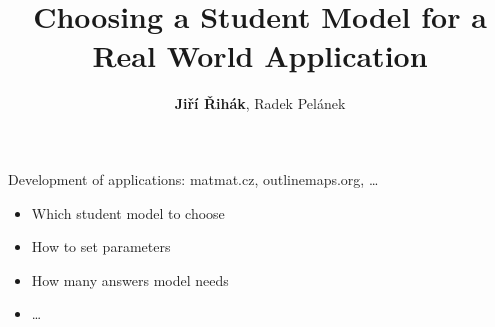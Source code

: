 \documentclass[xcolor=svgnames]{beamer}
\title[Choosing a Student Model for a Real World
Application]{Choosing a Student Model for a Real World
Application}
\author{\textbf{Ji\v{r}í \v{R}ihák}, Radek Pelánek}
\institute{Masaryk University Brno}
\date{}
\begin{document}
\frame[plain]{\titlepage}
\begin{frame}
    Development of applications: matmat.cz, outlinemaps.org, \dots
    \begin{itemize}
        \item Which student model to choose
        \item How to set parameters
        \item How many answers model needs
        \item \dots
    \end{itemize}
\end{frame}
\end{document}
